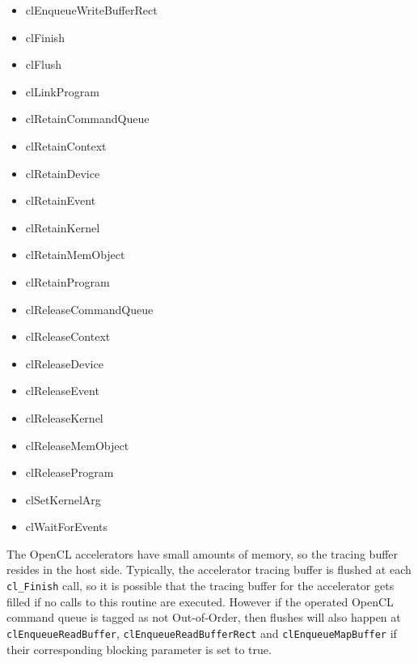 \begin{itemize}
\item clEnqueueWriteBufferRect
\item clFinish
\item clFlush
\item clLinkProgram
\item clRetainCommandQueue
\item clRetainContext
\item clRetainDevice
\item clRetainEvent
\item clRetainKernel
\item clRetainMemObject
\item clRetainProgram
\item clReleaseCommandQueue
\item clReleaseContext
\item clReleaseDevice
\item clReleaseEvent
\item clReleaseKernel
\item clReleaseMemObject
\item clReleaseProgram
\item clSetKernelArg
\item clWaitForEvents
\end{itemize}


The OpenCL accelerators have small amounts of memory, so the tracing buffer resides in the host side.
Typically, the accelerator tracing buffer is flushed at each {\tt cl\_Finish} call, so it is possible that the tracing buffer for the accelerator gets filled if no calls to this routine are executed.
However if the operated OpenCL command queue is tagged as not Out-of-Order, then flushes will also happen at {\tt clEnqueueReadBuffer}, {\tt clEnqueueReadBufferRect} and {\tt clEnqueueMapBuffer} if their corresponding blocking parameter is set to true.


